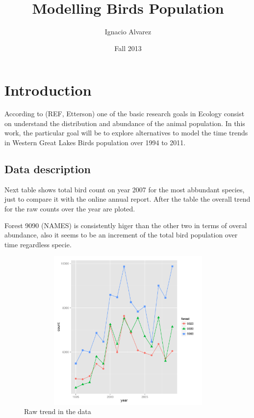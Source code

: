 \documentclass{article}\usepackage{graphicx, color}
\title{ Modelling Birds Population }
\author{Ignacio Alvarez}
\date{ Fall 2013 }
\begin{document}
\maketitle 

\section{Introduction} 
According to (REF, Etterson) one of the basic research goals in Ecology consist on understand the distribution and abundance of the animal population. In this work, the particular goal will be to explore alternatives to model the time trends in Western Great Lakes Birds population over 1994 to 2011. 

\vspace{2cm}

\subsection{Data description}

Next table shows total bird count on year 2007 for the most abbundant species, just to compare it with the online annual report. After the table the overall trend for the raw counts over the year are ploted. 

%

Forest 9090 (NAMES) is consistently higer than the other two in terms of overal abundance, also it seems to be an increment of the total bird population over time regardless specie.

\begin{figure}[h!]
\centering
\includegraphics[height=8cm, width=14cm]{rawtrend.pdf}
\caption{Raw trend in the data}
\end{figure}
\end{document}
